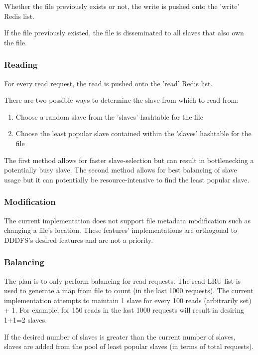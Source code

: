 \documentclass{article}
\begin{document}
Whether the file previously exists or not, the write is pushed onto the 'write' Redis list. 

If the file previously existed, the file is disseminated to all slaves that also own the file. 

\subsubsection{Reading}

For every read request, the read is pushed onto the 'read' Redis list. 

There are two possible ways to determine the slave from which to read from:

\begin{enumerate}
\item Choose a random slave from the 'slaves' hashtable for the file
\item Choose the least popular slave contained within the 'slaves' hashtable for the file
\end{enumerate}

The first method allows for faster slave-selection but can result in bottlenecking a potentially busy slave. The second method allows for best balancing of slave usage but it can potentially be resource-intensive to find the least popular slave. 

\subsubsection{Modification}

The current implementation does not support file metadata modification such as changing a file's location. These features' implementations are orthogonal to DDDFS's desired features and are not a priority. 

\subsubsection{Balancing}

The plan is to only perform balancing for read requests. The read LRU list is used to generate a map from file to count (in the last 1000 requests). The current implementation attempts to maintain 1 slave for every 100 reads (arbitrarily set) + 1. For example, for 150 reads in the last 1000 requests will result in desiring 1+1=2 slaves.  

If the desired number of slaves is greater than the current number of slaves, slaves are added from the pool of least popular slaves (in terms of total requests). 
\end{document}
